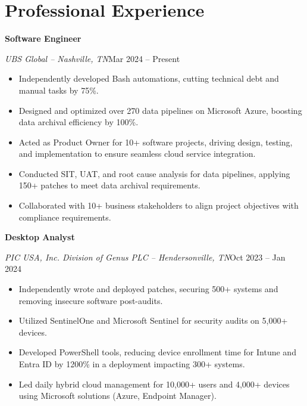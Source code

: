 \documentclass[a4paper]{article}
\begin{document}
\begin{minipage}[t]{0.62\textwidth}
    \raggedright
    \vspace*{0pt}

    \section{Professional Experience}
    \textbf{Software Engineer}\par
    \textit{UBS Global -- Nashville, TN}\hfill Mar 2024 -- Present

    \begin{itemize}[noitemsep,nolistsep]
        \item Independently developed Bash automations, cutting technical debt and manual tasks by 75\%.
        \item Designed and optimized over 270 data pipelines on Microsoft Azure, boosting data archival efficiency by 100\%.
        \item Acted as Product Owner for 10+ software projects, driving design, testing, and implementation to ensure seamless cloud service integration.
        \item Conducted SIT, UAT, and root cause analysis for data pipelines, applying 150+ patches to meet data archival requirements.
        \item Collaborated with 10+ business stakeholders to align project objectives with compliance requirements.
    \end{itemize}

    \vspace{0.5em}
    \textbf{Desktop Analyst}\par
    \textit{PIC USA, Inc. Division of Genus PLC -- Hendersonville, TN}\hfill Oct 2023 -- Jan 2024

    \begin{itemize}[noitemsep,nolistsep]
        \item Independently wrote and deployed patches, securing 500+ systems and removing insecure software post-audits.
        \item Utilized SentinelOne and Microsoft Sentinel for security audits on 5,000+ devices.
        \item Developed PowerShell tools, reducing device enrollment time for Intune and Entra ID by 1200\% in a deployment impacting 300+ systems.
        \item Led daily hybrid cloud management for 10,000+ users and 4,000+ devices using Microsoft solutions (Azure, Endpoint Manager).
    \end{itemize}


\end{minipage}
\end{document}
